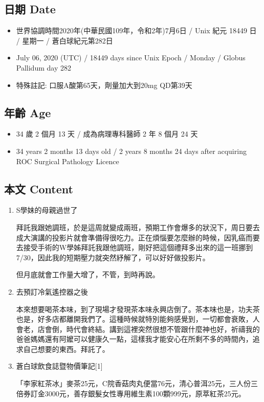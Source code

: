 \documentclass[
]{article}
\providecommand{\tightlist}{%
  \setlength{\itemsep}{0pt}\setlength{\parskip}{0pt}}
\begin{document}
\hypertarget{ux65e5ux671f-date-5}{%
\subsection{日期 Date}\label{ux65e5ux671f-date-5}}

\begin{itemize}
\tightlist
\item
  世界協調時間2020年(中華民國109年，令和2年)7月6日 / Unix 紀元 18449 日
  / 星期一 / 蒼白球紀元第282日
\item
  July 06, 2020 (UTC) / 18449 days since Unix Epoch / Monday / Globus
  Pallidum day 282
\item
  特殊註記: 口服A酸第65天，劑量加大到20mg QD第39天
\end{itemize}

\hypertarget{ux5e74ux9f61-age-5}{%
\subsection{年齡 Age}\label{ux5e74ux9f61-age-5}}

\begin{itemize}
\tightlist
\item
  34 歲 2 個月 13 天 / 成為病理專科醫師 2 年 8 個月 24 天
\item
  34 years 2 months 13 days old / 2 years 8 months 24 days after
  acquiring ROC Surgical Pathology Licence
\end{itemize}

\hypertarget{ux672cux6587-content-5}{%
\subsection{本文 Content}\label{ux672cux6587-content-5}}

\begin{enumerate}
\def\labelenumi{\arabic{enumi}.}
\item
  S學妹的母親過世了

  拜託我跟她調班，於是這周就變成兩班，預期工作會爆多的狀況下，周日要去成大演講的投影片就會準備得很吃力。正在煩惱要怎麼辦的時候，因乳癌而要去接受手術的W學姊拜託我跟他調班，剛好把這個禮拜多出來的這一班挪到7/30，因此我的短期壓力就突然紓解了，可以好好做投影片。

  但月底就會工作量大增了，不管，到時再說。
\item
  去預訂冷氣遙控器之後

  本來想要喝茶本味，到了現場才發現茶本味永興店倒了。茶本味也是，功夫茶也是，好多店都離開我們了。這種時候就特別能夠感覺到，一切都會衰敗，人會老，店會倒，時代會終結。講到這裡突然很想不管跟什麼神也好，祈禱我的爸爸媽媽還有阿嬤可以健康久一點，這樣我才能安心在所剩不多的時間內，追求自己想要的東西。拜託了。
\item
  蒼白球飲食誌暨物價筆記{[}1{]}

  「李家紅茶冰」麥茶25元，C院香菇肉丸便當76元，清心普洱25元，三人份三倍券訂金3000元，善存銀髮女性專用維生素100顆999元，原萃紅茶25元。
\end{enumerate}
\end{document}
